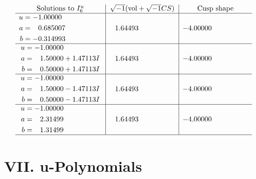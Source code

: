 \documentclass[1p]{elsarticle_modified}
\theoremstyle{definition}
\newcommand{\I}{\sqrt{-1}}
\begin{document}
$$\begin{array}{c|c|c}  
\text{Solutions to }I^u_{6}& \I (\text{vol} + \sqrt{-1}CS) & \text{Cusp shape}\\
 \hline 
\begin{aligned}
u &= -1.00000\phantom{ +0.000000I} \\
a &= \phantom{-}0.685007\phantom{ +0.000000I} \\
b &= -0.314993\phantom{ +0.000000I}\end{aligned}
 & \phantom{-}1.64493\phantom{ +0.000000I} & -4.00000\phantom{ +0.000000I} \\ \hline\begin{aligned}
u &= -1.00000\phantom{ +0.000000I} \\
a &= \phantom{-}1.50000 + 1.47113 I \\
b &= \phantom{-}0.50000 + 1.47113 I\end{aligned}
 & \phantom{-}1.64493\phantom{ +0.000000I} & -4.00000\phantom{ +0.000000I} \\ \hline\begin{aligned}
u &= -1.00000\phantom{ +0.000000I} \\
a &= \phantom{-}1.50000 - 1.47113 I \\
b &= \phantom{-}0.50000 - 1.47113 I\end{aligned}
 & \phantom{-}1.64493\phantom{ +0.000000I} & -4.00000\phantom{ +0.000000I} \\ \hline\begin{aligned}
u &= -1.00000\phantom{ +0.000000I} \\
a &= \phantom{-}2.31499\phantom{ +0.000000I} \\
b &= \phantom{-}1.31499\phantom{ +0.000000I}\end{aligned}
 & \phantom{-}1.64493\phantom{ +0.000000I} & -4.00000\phantom{ +0.000000I}\\
 \hline 
 \end{array}$$\newpage
\newpage\renewcommand{\arraystretch}{1}
\centering \section*{ VII. u-Polynomials}
\end{document}
